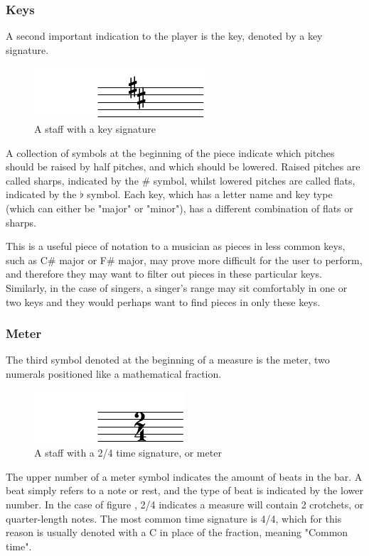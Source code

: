 \subsubsection{Keys}
A second important indication to the player is the key, denoted by a key signature.
\begin{figure}[h]
    \centering
        \includegraphics{key-crop.pdf}
    \caption{A staff with a key signature}
    \label{fig:key}
\end{figure}

A collection of symbols at the beginning of the piece indicate which pitches should be raised by half pitches, and which should be lowered. Raised pitches are called sharps, indicated by the \# symbol, whilst lowered pitches are called flats, indicated by the $\flat$ symbol. Each key, which has a letter name and key type (which can either be "major" or "minor"), has a different combination of flats or sharps. 

This is a useful piece of notation to a musician as pieces in less common keys, such as C\# major or F\# major, may prove more difficult for the user to perform, and therefore they may want to filter out pieces in these particular keys. Similarly, in the case of singers, a singer's range may sit comfortably in one or two keys and they would perhaps want to find pieces in only these keys. 

\subsubsection{Meter}
The third symbol denoted at the beginning of a measure is the meter, two numerals positioned like a mathematical fraction.

\begin{figure}[h]
    \centering
        \includegraphics{meter-crop.pdf}
    \caption{A staff with a 2/4 time signature, or meter}
    \label{fig:meter}
\end{figure}

The upper number of a meter symbol indicates the amount of beats in the bar. A beat simply refers to a note or rest, and the type of beat is indicated by the lower number. In the case of figure \label{fig:meter}, 2/4 indicates a measure will contain 2 crotchets, or quarter-length notes. The most common time signature is 4/4, which for this reason is usually denoted with a C in place of the fraction, meaning "Common time".

